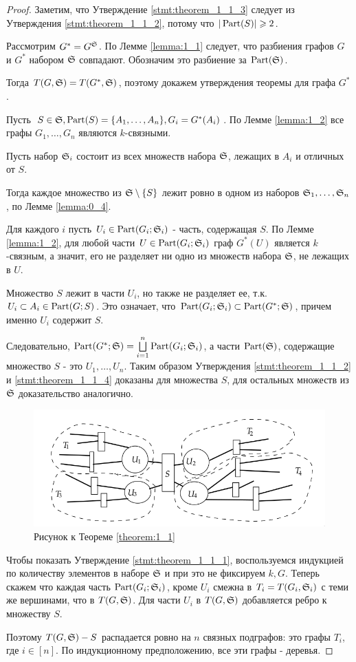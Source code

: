 \begin{proof}
	Заметим, что Утверждение \eqref{stmt:theorem_1_1_3} следует из Утверждения \eqref{stmt:theorem_1_1_2}, потому что $|\Part(S)| \geqslant 2$.

	Рассмотрим  $G^* = G^\S$.
	По Лемме \ref{lemma:1_1} следует, что разбиения графов  $G$ и  $G^*$ набором  $\S$ совпадают. Обозначим это разбиение за  $\Part(\S)$.

	Тогда  $T(G, \S) = T(G^*, \S)$, поэтому докажем утверждения теоремы для графа  $G^*$.

	Пусть $S \in \S, \Part(S) = \{A_1, \ldots, A_n\}, G_i = G^*(A_i)$.
	По Лемме \ref{lemma:1_2} все графы $G_1, \ldots, G_n$ являются  $k$-связными.

	Пусть набор  $\S_i$ состоит из всех множеств набора  $\S$, лежащих в  $A_i$ и отличных от  $S$.

	Тогда каждое множество из  $\S \setminus \{S\}$ лежит ровно в одном из наборов $\S_1, \ldots, \S_n$, по Лемме \ref{lemma:0_4}.

	Для каждого $i$ пусть $U_i \in \Part(G_i;\S_i)$ - часть, содержащая  $S$.
	По Лемме \ref{lemma:1_2}, для любой части $U \in \Part(G_i;\S_i)$ граф $G^*(U)$ является  $k$-связным, а значит, его не разделяет ни одно из множеств набора  $\S$, не лежащих в  $U$. 

	Множество $S$ лежит в части  $U_i$, но также не разделяет ее, т.к. $U_i \subset A_i \in \Part(G;S)$.
	Это означает, что  $\Part(G_i;\S_i) \subset \Part(G^*; \S)$, причем именно  $U_i$ содержит  $S$.

	Следовательно, $\Part(G^*; \S) = \bigsqcup\limits_{i=1}^n \Part(G_i;\S_i)$, а части  $\Part(\S)$, содержащие множество  $S$ - это  $U_1, \ldots, U_n$.
	Таким образом Утверждения \eqref{stmt:theorem_1_1_2} и \eqref{stmt:theorem_1_1_4} доказаны для множества  $S$, для остальных множеств из  $\S$ доказательство аналогично.

\begin{figure}[ht]
    \centering
	\includegraphics[width=0.5\columnwidth]{figures/theorem_1_1.png}
    \caption{Рисунок к Теореме \ref{theorem:1_1}}
    \label{fig:theorem_1_1}
\end{figure}

	Чтобы показать Утверждение \eqref{stmt:theorem_1_1_1}, воспользуемся индукцией по количеству элементов в наборе $\S$ и при это не фиксируем  $k, G$.
	Теперь скажем что каждая часть $\Part(G_i; \S_i)$, кроме  $U_i$ смежна в  $T_i = T(G_i, \S_i)$ с теми же вершинами, что в  $T(G, \S)$.
	Для части  $U_i$ в  $T(G, \S)$ добавляется ребро к множеству  $S$.

	Поэтому  $T(G, \S) - S$ распадается ровно на  $n$ связных подграфов: это графы  $T_i$, где  $i \in [n]$.
	По индукционному предположению, все эти графы - деревья.

\end{proof}

